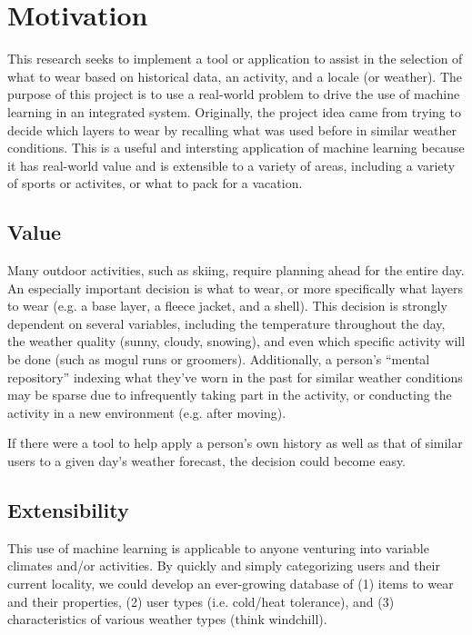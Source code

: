 \section{Motivation}
\label{section:motivation}
This research seeks to implement a tool or application to assist in the selection of what to wear based on
historical data, an activity, and a locale (or weather). The purpose of this project is to use a real-world
problem to drive the use of machine learning in an integrated system. Originally, the project idea came from trying
to decide which layers to wear by recalling what was used before in similar weather conditions. This is a
useful and intersting application of machine learning because it has real-world value and is extensible to a variety
of areas, including a variety of sports or activites, or what to pack for a vacation.

\subsection{Value}
Many outdoor activities, such as skiing, require planning ahead for the entire day. An especially important
decision is what to wear, or more specifically what layers to wear (e.g. a base layer, a fleece jacket, and a shell).
This decision is strongly dependent on several variables, including the temperature throughout the day, the weather
quality (sunny, cloudy, snowing), and even which specific activity will be done (such as mogul runs or groomers).
Additionally, a person's ``mental repository'' indexing what they've worn in the past for similar weather conditions
may be sparse due to infrequently taking part in the activity, or conducting the activity in a new environment (e.g.
after moving).

If there were a tool to help apply a person's own history as well as that of similar users to a given day's weather
forecast, the decision could become easy.

\subsection{Extensibility}
This use of machine learning is applicable to anyone venturing into variable climates and/or activities.
By quickly and simply categorizing
users and their current locality, we could develop an ever-growing database of (1) items to wear and their properties,
(2) user types (i.e. cold/heat tolerance), and (3) characteristics of various weather types (think windchill).

